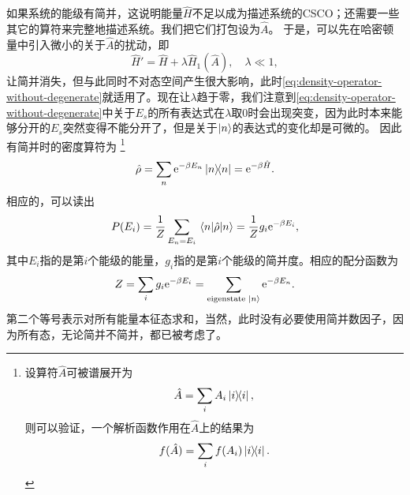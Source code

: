 \documentclass[hyperref, UTF8, a4paper]{ctexart}
\newcommand*{\ee}{\mathrm{e}}
\begin{document}
如果系统的能级有简并，这说明能量$\hat{H}$不足以成为描述系统的CSCO；还需要一些其它的算符来完整地描述系统。我们把它们打包设为$\hat{A}$。
于是，可以先在哈密顿量中引入微小的关于$\hat{A}$的扰动，即
\[
    \hat{H}' = \hat{H} + \lambda \hat{H}_1 (\hat{A}), \quad \lambda \ll 1,
\]
让简并消失，但与此同时不对态空间产生很大影响，此时\eqref{eq:density-operator-without-degenerate}就适用了。现在让$\lambda$趋于零，我们注意到\eqref{eq:density-operator-without-degenerate}中关于$E_s$的所有表达式在$\lambda$取0时会出现突变，因为此时本来能够分开的$E_s$突然变得不能分开了，但是关于$\ket{n}$的表达式的变化却是可微的。
因此有简并时的密度算符为%
\footnote{设算符$\hat{A}$可被谱展开为
\[
    \hat{A} = \sum_i A_i \dyad{i},
\]
则可以验证，一个解析函数作用在$\hat{A}$上的结果为
\[
    f(\hat{A}) = \sum_i f(A_i) \dyad{i}.
\]
}
\begin{equation}
    \hat{\rho} = \sum_n \ee^{-\beta E_n} \dyad{n} = \ee^{-\beta \hat{H}}.
    \label{eq:gibbs-density-operator}
\end{equation}
相应的，可以读出
\begin{equation}
    P(E_i) = \frac{1}{Z} \sum_{E_n = E_i} \mel{n}{\hat{\rho}}{n} = \frac{1}{Z} g_i \ee^{-\beta E_i},
\end{equation}
其中$E_i$指的是第$i$个能级的能量，$g_i$指的是第$i$个能级的简并度。相应的配分函数为
\begin{equation}
    Z = \sum_i g_i \ee^{- \beta E_i} = \sum_\text{eigenstate $\ket{n}$} \ee^{- \beta E_n} .
\end{equation}
第二个等号表示对所有能量本征态求和，当然，此时没有必要使用简并数因子，因为所有态，无论简并不简并，都已被考虑了。
\end{document}
